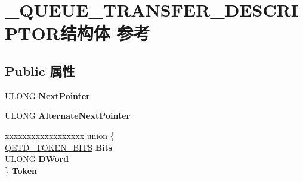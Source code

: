 \hypertarget{struct___q_u_e_u_e___t_r_a_n_s_f_e_r___d_e_s_c_r_i_p_t_o_r}{}\section{\+\_\+\+Q\+U\+E\+U\+E\+\_\+\+T\+R\+A\+N\+S\+F\+E\+R\+\_\+\+D\+E\+S\+C\+R\+I\+P\+T\+O\+R结构体 参考}
\label{struct___q_u_e_u_e___t_r_a_n_s_f_e_r___d_e_s_c_r_i_p_t_o_r}
\subsection*{Public 属性}
\begin{DoxyCompactItemize}
\item 
\mbox{\label{struct___q_u_e_u_e___t_r_a_n_s_f_e_r___d_e_s_c_r_i_p_t_o_r_a57d56331e1c1189f1abd85efe021f851}} 
U\+L\+O\+NG {\bfseries Next\+Pointer}
\item 
\mbox{\label{struct___q_u_e_u_e___t_r_a_n_s_f_e_r___d_e_s_c_r_i_p_t_o_r_a6fd30d396dee2e7b793fc7bfda5287cb}} 
U\+L\+O\+NG {\bfseries Alternate\+Next\+Pointer}
\item 
\mbox{\label{struct___q_u_e_u_e___t_r_a_n_s_f_e_r___d_e_s_c_r_i_p_t_o_r_a22276a2af40ba0a4a9a4b377b2f709fd}} 
\begin{tabbing}
xx\=xx\=xx\=xx\=xx\=xx\=xx\=xx\=xx\=\kill
union \{\\
\>\hyperlink{struct___q_e_t_d___t_o_k_e_n___b_i_t_s}{QETD\_TOKEN\_BITS} {\bfseries Bits}\\
\>ULONG {\bfseries DWord}\\
\} {\bfseries Token}\\


\end{tabbing}
\end{DoxyCompactItemize}
